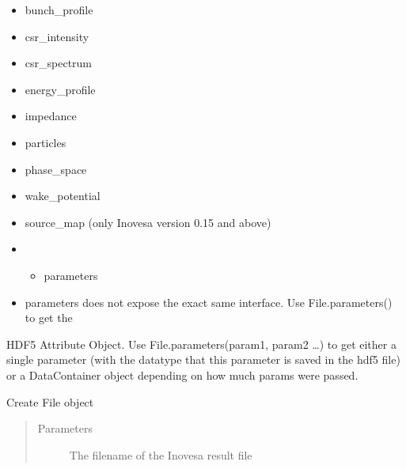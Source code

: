 \documentclass[letterpaper,10pt,openany,oneside,english]{sphinxmanual}
\begin{document}
\begin{fulllineitems}
\begin{itemize}
\item {} 
bunch\_profile

\item {} 
csr\_intensity

\item {} 
csr\_spectrum

\item {} 
energy\_profile

\item {} 
impedance

\item {} 
particles

\item {} 
phase\_space

\item {} 
wake\_potential

\item {} 
source\_map (only Inovesa version 0.15 and above)

\item {} \begin{itemize}
\item {} 
parameters

\end{itemize}

\end{itemize}
\begin{itemize}
\item {} 
parameters does not expose the exact same interface. Use File.parameters() to get the

\end{itemize}

HDF5 Attribute Object. Use File.parameters(param1, param2 …) to get either a single parameter  
(with the datatype that this parameter is saved in the hdf5 file) or a DataContainer object  
depending on how much params were passed.

\begin{fulllineitems}
\label{\detokenize{file:file.File.__init__}}
Create File object
\begin{quote}\begin{description}
\item[{Parameters}] \leavevmode
{} \textendash{} The filename of the Inovesa result file

\end{description}\end{quote}


\end{fulllineitems}
\end{fulllineitems}
\end{document}

